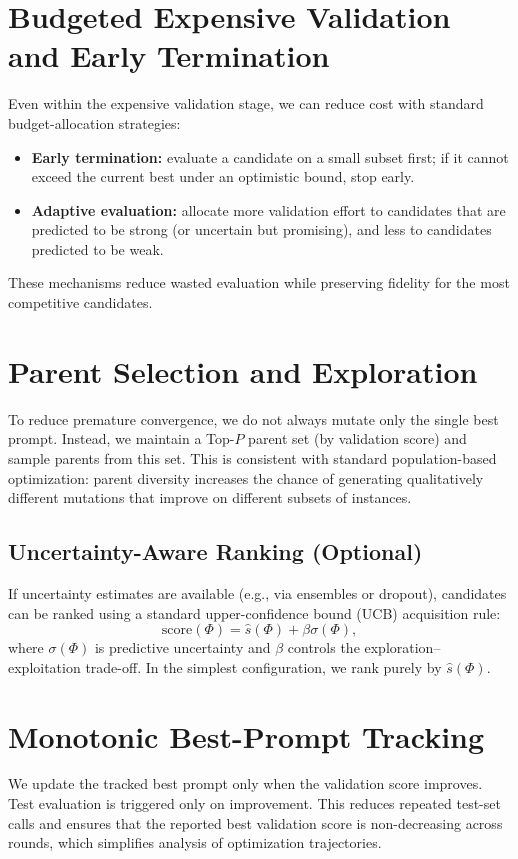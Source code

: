 \section{Budgeted Expensive Validation and Early Termination}
Even within the expensive validation stage, we can reduce cost with standard budget-allocation strategies:
\begin{itemize}
    \item \textbf{Early termination:} evaluate a candidate on a small subset first; if it cannot exceed the current best under an optimistic bound, stop early.
    \item \textbf{Adaptive evaluation:} allocate more validation effort to candidates that are predicted to be strong (or uncertain but promising), and less to candidates predicted to be weak.
\end{itemize}
These mechanisms reduce wasted evaluation while preserving fidelity for the most competitive candidates.

\section{Parent Selection and Exploration}
To reduce premature convergence, we do not always mutate only the single best prompt. Instead, we maintain a Top-$P$ parent set (by validation score) and sample parents from this set. This is consistent with standard population-based optimization: parent diversity increases the chance of generating qualitatively different mutations that improve on different subsets of instances.

\subsection{Uncertainty-Aware Ranking (Optional)}
If uncertainty estimates are available (e.g., via ensembles or dropout), candidates can be ranked using a standard upper-confidence bound (UCB) acquisition rule:
\[
\text{score}(\Phi) = \widehat{s}(\Phi) + \beta \sigma(\Phi),
\]
where $\sigma(\Phi)$ is predictive uncertainty and $\beta$ controls the exploration--exploitation trade-off. In the simplest configuration, we rank purely by $\widehat{s}(\Phi)$.

\section{Monotonic Best-Prompt Tracking}
We update the tracked best prompt only when the validation score improves. Test evaluation is triggered only on improvement. This reduces repeated test-set calls and ensures that the reported best validation score is non-decreasing across rounds, which simplifies analysis of optimization trajectories.

